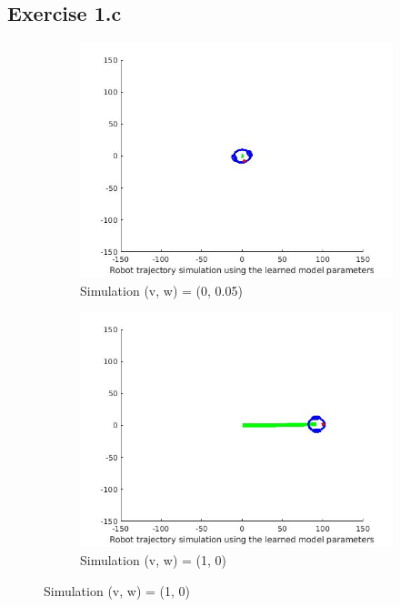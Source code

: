 \documentclass{article}
\begin{document}
\subsection*{Exercise 1.c}
\begin{figure}[ht]
	\begin{subfigure}{.5\textwidth}
		\centering
		\includegraphics[width=1.\linewidth]{1.jpg}  
		\caption{Simulation (v, w) = (0, 0.05)}
	\end{subfigure}
	\begin{subfigure}{.5\textwidth}
		\centering
		\includegraphics[width=1.\linewidth]{2.jpg}  
		\caption{Simulation (v, w) = (1, 0)}
	\end{subfigure}

\end{figure}
\end{document}
